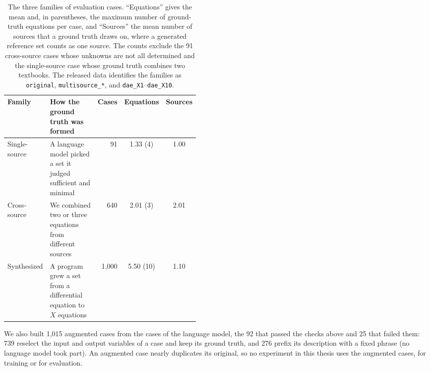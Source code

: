 \begin{table}[H]
\centering
\caption{The three families of evaluation cases. ``Equations'' gives the mean and, in parentheses,
the maximum number of ground-truth equations per case, and ``Sources'' the mean number of sources
that a ground truth draws on, where a generated reference set counts as one source. The counts
exclude the 91 cross-source cases whose unknowns are not all determined and the single-source case
whose ground truth combines two textbooks. The released data
identifies the families as \texttt{original}, \texttt{multisource\_*}, and
\texttt{dae\_X1}--\texttt{dae\_X10}.}
\label{tab:families}
\small
\begin{tabular}{l>{\raggedright\arraybackslash}p{0.45\linewidth}rcc}
\toprule
Family & How the ground truth was formed & Cases & Equations & Sources \\
\midrule
Single-source  & A language model picked a set it judged sufficient and minimal & 91 & 1.33 (4) & 1.00 \\
Cross-source   & We combined two or three equations from different sources & 640 & 2.01 (3) & 2.01 \\
Synthesized    & A program grew a set from a differential equation to $X$ equations & 1{,}000 & 5.50 (10) & 1.10 \\
\bottomrule
\end{tabular}
\end{table}

We also built 1,015 augmented cases from the cases of the language model, the 92 that passed the
checks above and 25 that failed them: 739 reselect the input and output variables of a case and
keep its ground truth, and 276 prefix its description with a fixed phrase (no language model took
part). An augmented case nearly duplicates its original, so no experiment in this thesis uses the
augmented cases, for training or for evaluation.

